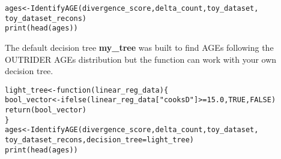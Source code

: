 \documentclass[9pt]{article}\usepackage[]{graphicx}\usepackage[usenames,dvipsnames]{color}
\newcommand{\hlnum}[1]{\textcolor[rgb]{0.816,0.125,0.439}{#1}}%
\newcommand{\hlstr}[1]{\textcolor[rgb]{0.251,0.627,0.251}{#1}}%
\newcommand{\hlopt}[1]{\textcolor[rgb]{0,0,0}{#1}}%
\newcommand{\hlstd}[1]{\textcolor[rgb]{0.251,0.251,0.251}{#1}}%
\newcommand{\hlkwa}[1]{\textcolor[rgb]{0.125,0.125,0.941}{#1}}%
\newcommand{\hlkwb}[1]{\textcolor[rgb]{0,0,0}{#1}}%
\newcommand{\hlkwc}[1]{\textcolor[rgb]{0.251,0.251,0.251}{#1}}%
\newcommand{\hlkwd}[1]{\textcolor[rgb]{0.878,0.439,0.125}{#1}}%
\newenvironment{knitrout}{}{} %
\begin{document}
\begin{knitrout}
\color{fgcolor}\begin{kframe}
\begin{alltt}
\hlstd{ages} \hlkwb{<-} \hlkwd{IdentifyAGE}\hlstd{(divergence_score, delta_count, toy_dataset,}
                    \hlstd{toy_dataset_recons)}
\hlkwd{print}\hlstd{(}\hlkwd{head}\hlstd{(ages))}
\end{alltt}
\end{kframe}
\end{knitrout}

The default decision tree \textbf{my\_tree} was built to find AGEs following the OUTRIDER AGEs distribution but the function can work with your own decision tree.

\begin{knitrout}
\color{fgcolor}\begin{kframe}
\begin{alltt}
\hlstd{light_tree} \hlkwb{<-} \hlkwa{function}\hlstd{(}\hlkwc{linear_reg_data}\hlstd{)\{}
  \hlstd{bool_vector} \hlkwb{<-} \hlkwd{ifelse}\hlstd{(linear_reg_data[}\hlstr{"cooksD"}\hlstd{]} \hlopt{>=} \hlnum{15.0}\hlstd{,}\hlnum{TRUE}\hlstd{,}\hlnum{FALSE}\hlstd{)}
  \hlkwd{return}\hlstd{(bool_vector)}
\hlstd{\}}
\hlstd{ages} \hlkwb{<-} \hlkwd{IdentifyAGE}\hlstd{(divergence_score, delta_count, toy_dataset,}
                    \hlstd{toy_dataset_recons,} \hlkwc{decision_tree} \hlstd{= light_tree)}
\hlkwd{print}\hlstd{(}\hlkwd{head}\hlstd{(ages))}
\end{alltt}
\end{kframe}
\end{knitrout}
\end{document}
